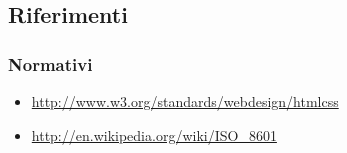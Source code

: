 \subsection{Riferimenti}

\subsubsection{Normativi}

\begin{itemize}
	\item \url{http://www.w3.org/standards/webdesign/htmlcss}
	\item \url{http://en.wikipedia.org/wiki/ISO_8601}	
\end{itemize}

